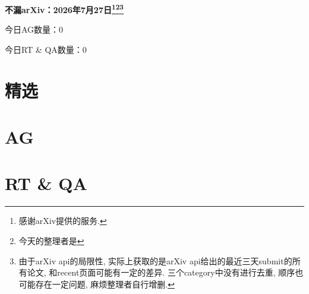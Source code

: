 \documentclass[9pt, a4paper]{article}
\theoremstyle{plain}
\theoremstyle{definition}
\theoremstyle{remark}
\newcommand{\AGnumber}{0}
\newcommand{\RTQAnumber}{0}
\newcommand{\NewestDate}{2026年7月27日}
\newcommand{\todayarXiver}{} %
\begin{document}
\begin{center}
    \Huge\textbf{不漏arXiv：\NewestDate\footnote{感谢arXiv提供的服务.}\footnote{今天的整理者是\todayarXiver}\footnote{由于arXiv api的局限性, 实际上获取的是arXiv api给出的最近三天submit的所有论文, 和recent页面可能有一定的差异. 三个category中没有进行去重, 顺序也可能存在一定问题, 麻烦整理者自行增删.}} \\
\end{center}

\setcounter{section}{-1}

\begin{center}
    今日AG数量：\AGnumber
    
    今日RT \& QA数量：\RTQAnumber
    
\end{center}


\section{精选}


\section{AG}

\section{RT \& QA}
\end{document}
